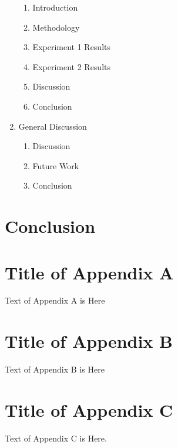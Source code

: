 \documentclass{article}
\begin{document}
\begin{enumerate}
	\begin{enumerate}
		\item Introduction
		\item Methodology
		\item Experiment 1 Results
		\item Experiment 2 Results
		\item Discussion
		\item Conclusion
	\end{enumerate}
	\item General Discussion
	\begin{enumerate}
		\item Discussion
		\item Future Work
		\item Conclusion
	\end{enumerate}
\end{enumerate}

\section{Conclusion}




\appendix
\section{Title of Appendix A}
Text of Appendix A is Here

\section{Title of Appendix B}
Text of Appendix B is Here

\section{Title of Appendix C}
Text of Appendix C is Here.
\end{document}
